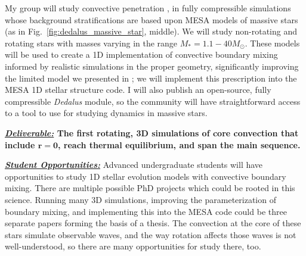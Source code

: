 \documentclass[12pt]{article}
\begin{document}
My group will study convective penetration \citep[Fig \ref{fig:penconv}, left,][]{anders_etal_2022a}, in fully compressible simulations whose background stratifications are based upon MESA models of massive stars (as in Fig.~\ref{fig:dedalus_massive_star}, middle).
We will study non-rotating and rotating stars with masses varying in the range $M_* = 1.1-40 M_{\odot}$.
These models will be used to create a 1D implementation of convective boundary mixing informed by realistic simulations in the proper geometry, significantly improving the limited model we presented in \citep{anders_etal_2022a}; we will implement this prescription into the MESA 1D stellar structure code.
I will also publish an open-source, fully compressible \emph{Dedalus} module, so the community will have straightforward access to a tool to use for studying dynamics in massive stars.

\textbf{\underline{\emph{Deliverable:}} The first rotating, 3D simulations of core convection that include $\boldsymbol{r = 0}$, reach thermal equilibrium, and span the main sequence.}

\textbf{\underline{\emph{Student Opportunities:}}} Advanced undergraduate students will have opportunities to study 1D stellar evolution models with convective boundary mixing.
There are multiple possible PhD projects which could be rooted in this science.
Running many 3D simulations, improving the parameterization of boundary mixing, and implementing this into the MESA code could be three separate papers forming the basis of a thesis.
The convection at the core of these stars simulate observable waves, and the way rotation affects those waves is not well-understood, so there are many opportunities for study there, too.
\end{document}
